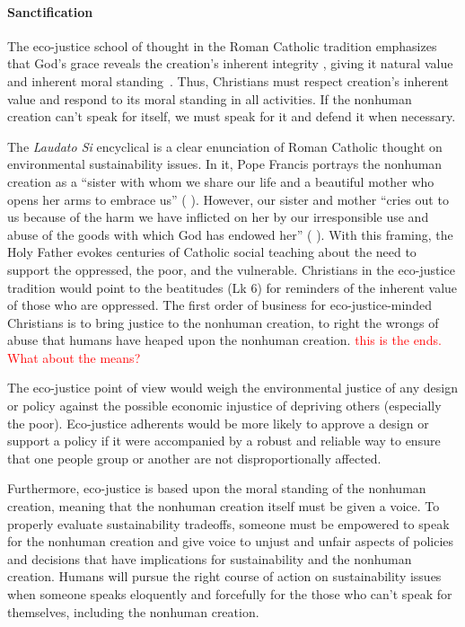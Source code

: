\documentclass[12pt]{article}
\newcommand{\ins}[1]{\textcolor{red}{#1}}
\begin{document}
\paragraph{Sanctification} 
\label{sec:sanctification}

The eco-justice school of thought in the Roman Catholic tradition
emphasizes that God's grace reveals the creation's 
inherent integrity \autocite[19]{Jenkins:2008}, 
giving it natural value and inherent moral standing~\autocite{Joldersma:2019}. 
Thus, Christians must respect creation's inherent value and 
respond to its moral standing in all activities.
If the nonhuman creation can't speak for itself, 
we must speak for it and defend it when necessary.

The \emph{Laudato Si} encyclical \autocite{Pope-Francis:2015aa} 
is a clear enunciation of Roman Catholic thought
on environmental sustainability issues.
In it, Pope Francis portrays the nonhuman creation as a
``sister with whom we share our life and a beautiful mother who opens her arms to embrace us''
(\textcite{Pope-Francis:2015aa} \textcite[3]{Pope-Francis:2015aa}).
However, our sister and mother
``cries out to us because of the harm we have inflicted on her 
by our irresponsible use and abuse of the goods with which God has endowed her''
(\textcite{Pope-Francis:2015aa} \textcite[3]{Pope-Francis:2015aa}).
With this framing, the Holy Father evokes centuries of Catholic social teaching
about the need to support the oppressed, the poor, and the vulnerable.
Christians in the eco-justice tradition would point to the beatitudes (Lk 6) 
for reminders of the inherent value of those who are oppressed.
The first order of business for eco-justice-minded Christians
is to bring justice to the nonhuman creation, to right the wrongs
of abuse that humans have heaped upon the nonhuman creation.
\ins{this is the ends. What about the means?}

The eco-justice point of view
would weigh the environmental justice of any design or policy
against the possible economic injustice of depriving others
(especially the poor). 
Eco-justice adherents would be more likely to approve a design or support a policy if it
were accompanied by a robust and reliable way to ensure that one people group or another
are not disproportionally affected.

Furthermore, eco-justice is based upon the moral standing of the nonhuman creation,
meaning that the nonhuman creation itself must be given a voice.
To properly evaluate sustainability tradeoffs,
someone must be empowered to speak for the nonhuman creation and
give voice to unjust and unfair aspects of policies and decisions
that have implications for sustainability and the nonhuman creation.
Humans will pursue the right course of action on sustainability issues
when someone speaks eloquently and forcefully for the
those who can't speak for themselves, including the nonhuman creation.
\end{document}
